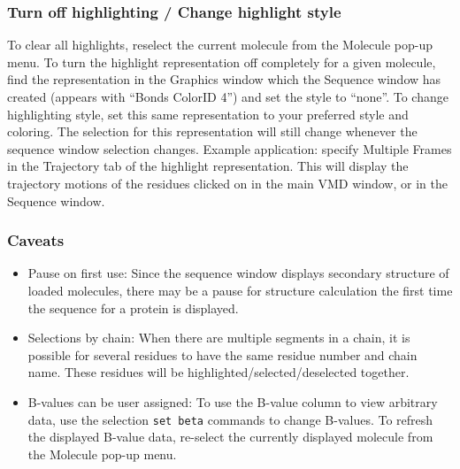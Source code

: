 \subsubsection {Turn off highlighting / Change highlight style}
\label{ug:ui:window:sequence:offchange}

        
 To clear all highlights, reselect the current molecule from the {\sf Molecule} pop-up menu.
 To turn the highlight representation off completely for a given molecule, find the representation in the Graphics window which the Sequence window 
has created (appears with ``{\sf Bonds} {\sf ColorID 4}'') and set  the style to  ``none''.
To change highlighting style, set this same representation
to your preferred style and  coloring.  The selection for this
representation will still change whenever the sequence window selection changes.
Example application: specify {Multiple Frames} in the {\sf Trajectory} tab of
the highlight representation. This will display the trajectory motions of the
residues clicked on in the main VMD window, or in the Sequence window. 



\subsubsection{Caveats}

\begin{itemize}
         	
  
  \item Pause on first use:
       Since the sequence window displays secondary structure of loaded molecules, there may
       be a pause for structure calculation the first time the sequence for a protein is displayed. 

  \item Selections by chain: 
      When there are multiple segments in a chain, it is possible for several
residues to have the same residue number and chain name.  These 
residues will be highlighted/selected/deselected
together.
 
  \item B-values can be user assigned: To use the B-value column to view
arbitrary data, use the selection {\tt set beta} commands to change B-values.
To refresh the displayed B-value data, re-select the currently displayed
molecule from the {\sf Molecule} pop-up menu.  \end{itemize}

